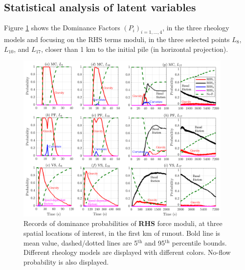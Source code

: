 \documentclass{article}
\begin{document}
\subsection{Statistical analysis of latent variables}\label{Hq2}
Figure \ref{fig:Colima-Pr1} shows the Dominance Factors $(P_i)_{i=1,\dots,4}$, in the three rheology models and focusing on the RHS terms moduli, in the three selected points $L_{8}$, $L_{10}$, and $L_{17}$, closer than 1 km to the initial pile (in horizontal projection). 
\begin{figure}[H]
         \centering
        \includegraphics[width=0.95\textwidth]{BAF_VolcanDeColima/ForceContrib/Pr1_total.png}
        \caption{Records of dominance probabilities of \textbf{RHS} force moduli, at three spatial locations of interest, in the first km of runout. Bold line is mean value, dashed/dotted lines are 5$^{\mathrm{th}}$ and 95$^{\mathrm{th}}$ percentile bounds. Different rheology models are displayed with different colors. No-flow probability is also displayed.}
        \label{fig:Colima-Pr1}
\end{figure}
\end{document}
